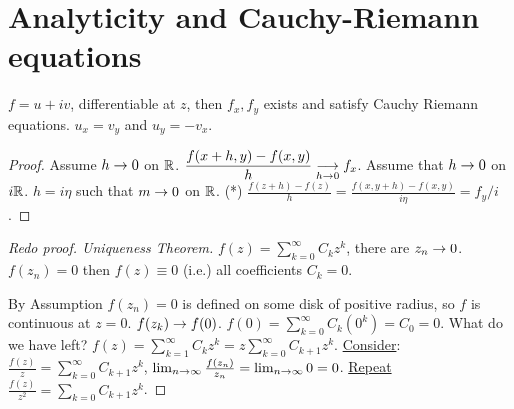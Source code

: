 \documentclass[]{article}
\begin{document}
\section{Analyticity and Cauchy-Riemann equations}

\begin{proposition}
	$f = u+iv$, differentiable at $z$, then $f_x,f_y$ exists and satisfy Cauchy Riemann equations. $u_x=v_y$ and $u_y=-v_x$.
\end{proposition}
\begin{proof}
	Assume $h\rightarrow 0$ on $\mathbb{R}$. $\displaystyle \frac{f(x+h,y)-f(x,y)}{h} \underset{h\rightarrow0}{\longrightarrow} f_x$. Assume that $h\rightarrow 0$ on $i\mathbb{R}$. $h=i\eta$ such that $m\rightarrow0$ on $\mathbb{R}$. (*) $\displaystyle\frac{f(z+h)-f(z)}{h} = \frac{f(x,y+h)-f(x,y)}{i\eta} = f_y/i$.
\end{proof}

\begin{proof}
	[Redo proof. Uniqueness Theorem] $f(z) = \sum_{k=0}^\infty C_k z^k$, there are $z_n\rightarrow 0$. $f(z_n) = 0$ then $f(z) \equiv 0$ (i.e.) all coefficients $C_k=0$.
	
	By Assumption $f(z_n)=0$ is defined on some disk of positive radius, so $f$ is continuous at $z=0$. $f(z_k)\rightarrow f(0)$. $f(0) = \sum_{k=0}^\infty C_k (0^k) = C_0 = 0$.
	What do we have left? $f(z)=\sum_{k=1}^\infty C_k z^k = z \sum_{k=0}^\infty C_{k+1} z^k$. \underline{Consider}: $\frac{f(z)}{z} = \sum_{k=0}^\infty C_{k+1} z^k$, $\lim_{n\rightarrow\infty} \frac{f(z_n)}{z_n} = \lim_{n\rightarrow \infty} 0 = 0$. \underline{Repeat} $\frac{f(z)}{z^2} = \sum_{k=0} C_{k+1} z^k$.
\end{proof}
\end{document}
